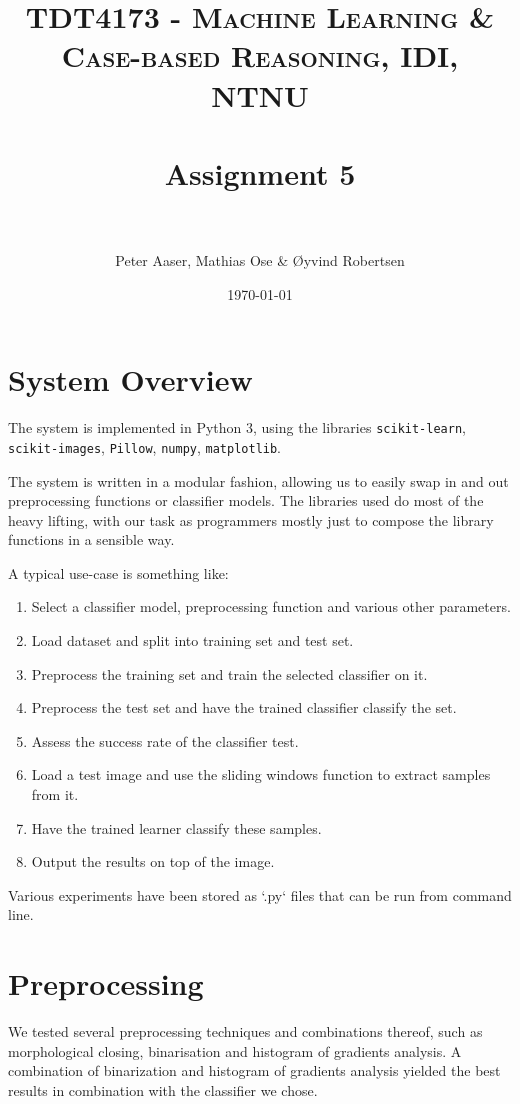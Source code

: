 \documentclass[paper=a4, fontsize=11pt]{scrartcl} %
\title{	
    \normalfont \normalsize 
    \textsc{TDT4173 - Machine Learning \& Case-based Reasoning, IDI, NTNU} \\ [25pt] %
    \horrule{0.5pt} \\[0.4cm] %
    \huge Assignment 5 \\ %
    \horrule{2pt} \\[0.5cm] %
}
\author{Peter Aaser, Mathias Ose \& Øyvind Robertsen} %
\date{\normalsize\today} %
\numberwithin{equation}{section} %
\numberwithin{figure}{section} %
\numberwithin{table}{section} %
\begin{document}
\maketitle %

\section{System Overview}
The system is implemented in Python 3, using the libraries \texttt{scikit-learn}, \texttt{scikit-images}, \texttt{Pillow}, \texttt{numpy}, \texttt{matplotlib}.

The system is written in a modular fashion, allowing us to easily swap in and out preprocessing functions or classifier models.
The libraries used do most of the heavy lifting, with our task as programmers mostly just to compose the library functions in a sensible way.

\hspace{0.25cm}

A typical use-case is something like:
    \begin{enumerate}
        \item   Select a classifier model, preprocessing function and various other parameters.
        \item   Load dataset and split into training set and test set.
        \item   Preprocess the training set and train the selected classifier on it.
        \item   Preprocess the test set and have the trained classifier classify the set.
        \item   Assess the success rate of the classifier test.
        \item   Load a test image and use the sliding windows function to extract samples from it.
        \item   Have the trained learner classify these samples.
        \item   Output the results on top of the image.
    \end{enumerate}

Various experiments have been stored as `.py` files that can be run from command line.

\section{Preprocessing}

We tested several preprocessing techniques and combinations thereof,
such as morphological closing, binarisation and histogram of gradients
analysis.  A combination of binarization and histogram of gradients
analysis yielded the best results in combination with the classifier
we chose.
\end{document}

